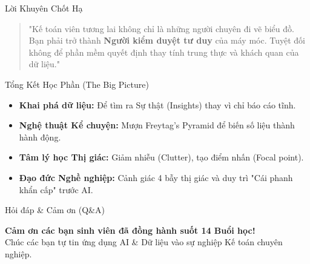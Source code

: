 \documentclass[aspectratio=169,12pt]{beamer}
\begin{document}
\begin{frame}{Lời Khuyên Chốt Hạ}
    \begin{quote}
        "Kế toán viên tương lai không chỉ là những người chuyên đi vẽ biểu đồ. Bạn phải trở thành \textbf{Người kiểm duyệt tư duy} của máy móc. Tuyệt đối không để phần mềm quyết định thay tính trung thực và khách quan của dữ liệu."
    \end{quote}
\end{frame}

\begin{frame}{Tổng Kết Học Phần (The Big Picture)}
    \begin{itemize}
        \item \textbf{Khai phá dữ liệu:} Để tìm ra Sự thật (Insights) thay vì chỉ báo cáo tĩnh.
        \item \textbf{Nghệ thuật Kể chuyện:} Mượn Freytag's Pyramid để biến số liệu thành hành động.
        \item \textbf{Tâm lý học Thị giác:} Giảm nhiễu (Clutter), tạo điểm nhấn (Focal point).
        \item \textbf{Đạo đức Nghề nghiệp:} Cảnh giác 4 bẫy thị giác và duy trì "Cái phanh khẩn cấp" trước AI.
    \end{itemize}
\end{frame}

\begin{frame}{Hỏi đáp \& Cảm ơn (Q\&A)}
    \begin{center}
        \Large \textbf{Cảm ơn các bạn sinh viên đã đồng hành suốt 14 Buổi học!}\\
        \vspace{1cm}
        Chúc các bạn tự tin ứng dụng AI \& Dữ liệu vào sự nghiệp Kế toán chuyên nghiệp.
    \end{center}
\end{frame}
\end{document}
